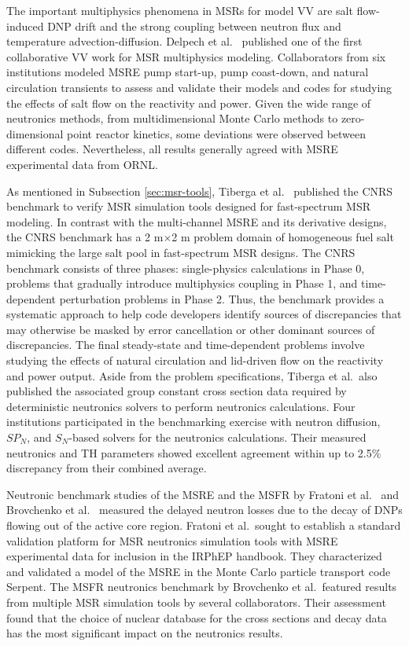 The important multiphysics phenomena in \glspl{MSR} for model \gls{VV} are salt flow-induced
\gls{DNP} drift and the strong coupling between neutron flux and temperature advection-diffusion.
Delpech et al.\ \cite{delpech_benchmark_2003} published one of the first collaborative \gls{VV} work
for \gls{MSR} multiphysics modeling. Collaborators
from six institutions modeled \gls{MSRE} pump start-up, pump coast-down, and natural
circulation transients to assess and validate their models and codes for studying the effects of
salt flow on the reactivity and power. Given the wide range of neutronics methods, from
multidimensional Monte Carlo methods to zero-dimensional point reactor kinetics, some deviations
were observed between different codes. Nevertheless, all results generally agreed
with \gls{MSRE} experimental data from \gls{ORNL}.

As mentioned in Subsection \ref{sec:msr-tools}, Tiberga et al.\ \cite{tiberga_results_2020}
published the CNRS benchmark to verify \gls{MSR} simulation tools designed for
fast-spectrum \gls{MSR} modeling. In contrast with the multi-channel \gls{MSRE} and its derivative
designs, the CNRS benchmark has a 2 m$\times$2 m problem domain of homogeneous fuel salt mimicking
the large salt pool in fast-spectrum \gls{MSR} designs. The CNRS benchmark consists of three
phases: single-physics calculations in Phase 0, problems that gradually
introduce multiphysics coupling in Phase 1, and time-dependent perturbation problems in Phase
2. Thus, the benchmark provides a systematic approach to help code developers
identify sources of discrepancies that may otherwise be masked by error cancellation or other
dominant sources of discrepancies. The final steady-state and time-dependent problems involve
studying the effects of natural circulation and lid-driven flow on the reactivity and power output.
Aside from the problem specifications, Tiberga et al.\ also published the associated group
constant cross section data required by deterministic neutronics solvers to perform neutronics
calculations. Four institutions participated in the benchmarking exercise with neutron diffusion,
$SP_N$, and $S_N$-based solvers for the neutronics calculations. Their measured neutronics and
\gls{TH} parameters showed excellent agreement within up to 2.5\% discrepancy from their combined
average.

Neutronic benchmark studies of the \gls{MSRE} and the \gls{MSFR} by Fratoni et al.\
\cite{fratoni_molten_2020} and Brovchenko et al.\ \cite{brovchenko_neutronic_2019} measured the
delayed neutron losses due to the decay of \glspl{DNP} flowing out of the active core region.
Fratoni et al.\ sought to establish a standard validation platform for \gls{MSR} neutronics
simulation tools with \gls{MSRE} experimental data for inclusion in the \gls{IRPhEP} handbook.
They characterized and validated a model of the \gls{MSRE} in the Monte Carlo particle transport
code Serpent. The \gls{MSFR} neutronics benchmark by Brovchenko et al.\ featured results
from multiple \gls{MSR} simulation tools by several collaborators. Their assessment found that
the choice of nuclear database for the cross sections and decay data has the most significant
impact on the neutronics results.

